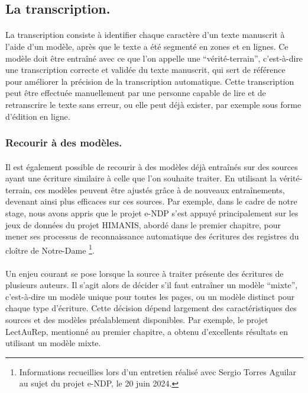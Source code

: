 \documentclass[a4paper,12pt,twoside]{book}
\begin{document}
\subsection{La transcription.}

\paragraph{}
La transcription consiste à identifier chaque caractère d'un texte manuscrit à l'aide d'un modèle, après que le texte a été segmenté en zones et en lignes. Ce modèle doit être entraîné avec ce que l'on appelle une \enquote{vérité-terrain}, c'est-à-dire une transcription correcte et validée du texte manuscrit, qui sert de référence pour améliorer la précision de la transcription automatique. Cette transcription peut être effectuée manuellement par une personne capable de lire et de retranscrire le texte sans erreur, ou elle peut déjà exister, par exemple sous forme d'édition en ligne.

\subsubsection{Recourir à des modèles.}

\paragraph{}
Il est également possible de recourir à des modèles déjà entraînés sur des sources ayant une écriture similaire à celle que l'on souhaite traiter. En utilisant la vérité-terrain, ces modèles peuvent être ajustés grâce à de nouveaux entraînements, devenant ainsi plus efficaces sur ces sources. Par exemple, dans le cadre de notre stage, nous avons appris que le projet e-NDP s'est appuyé principalement sur les jeux de données du projet HIMANIS, abordé dans le premier chapitre, pour mener ses processus de reconnaissance automatique des écritures des registres du cloître de Notre-Dame \footnote{Informations recueillies lors d'un entretien réalisé avec Sergio Torres Aguilar au sujet du projet e-NDP, le 20 juin 2024.}. 

\paragraph{}
Un enjeu courant se pose lorsque la source à traiter présente des écritures de plusieurs auteurs. Il s'agit alors de décider s'il faut entraîner un modèle \enquote{mixte}, c'est-à-dire un modèle unique pour toutes les pages, ou un modèle distinct pour chaque type d'écriture. Cette décision dépend largement des caractéristiques des sources et des modèles préalablement disponibles. Par exemple, le projet LectAuRep, mentionné au premier chapitre, a obtenu d'excellents résultats en utilisant un modèle mixte.
\end{document}
